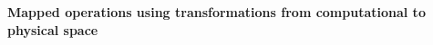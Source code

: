 \ifx\havefulldoc\undefined
  
  
  \fi

\begin{center}
  \large\bfseries Mapped operations using transformations from computational to
  physical space
\end{center}

\newcommand{\eqnref}[1]{\text{Eq.}~(\ref{eq:#1})}

\newcommand{\NtJ}{\frac{{\NrmT}}{J}}
\newcommand{\NtJs}[1]{\frac{{\NrmT}_{#1}}{J}}
\newcommand{\NJ}{\frac{{\Nrm}}{J}}
\newcommand{\rmT}{{\rm T}}

\usetikzlibrary{calc}
\usetikzlibrary{patterns}



